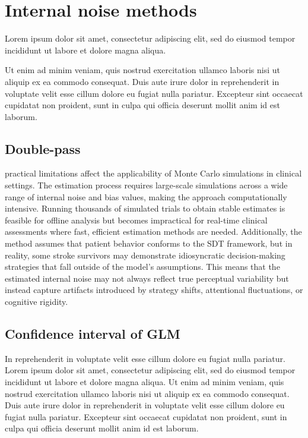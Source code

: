 \renewcommand{\chaptername}{Chapter} 
\chapter{Internal noise methods}\label{chap6}

Lorem ipsum dolor sit amet, consectetur adipiscing elit, sed do eiusmod tempor incididunt ut labore et dolore magna aliqua. 

Ut enim ad minim veniam, quis nostrud exercitation ullamco laboris nisi ut aliquip ex ea commodo consequat. Duis aute irure dolor in reprehenderit in voluptate velit esse cillum dolore eu fugiat nulla pariatur. Excepteur sint occaecat cupidatat non proident, sunt in culpa qui officia deserunt mollit anim id est laborum.

\section {Double-pass}

practical limitations affect the applicability of Monte Carlo simulations in clinical settings. The estimation process requires large-scale simulations across a wide range of internal noise and bias values, making the approach computationally intensive. Running thousands of simulated trials to obtain stable estimates is feasible for offline analysis but becomes impractical for real-time clinical assessments where fast, efficient estimation methods are needed. Additionally, the method assumes that patient behavior conforms to the SDT framework, but in reality, some stroke survivors may demonstrate idiosyncratic decision-making strategies that fall outside of the model’s assumptions. This means that the estimated internal noise may not always reflect true perceptual variability but instead capture artifacts introduced by strategy shifts, attentional fluctuations, or cognitive rigidity.

\section {Confidence interval of GLM} In reprehenderit in voluptate velit esse cillum dolore eu fugiat nulla pariatur. Lorem ipsum dolor sit amet, consectetur adipiscing elit, sed do eiusmod tempor incididunt ut labore et dolore magna aliqua. Ut enim ad minim veniam, quis nostrud exercitation ullamco laboris nisi ut aliquip ex ea commodo consequat. Duis aute irure dolor in reprehenderit in voluptate velit esse cillum dolore eu fugiat nulla pariatur. Excepteur sint occaecat cupidatat non proident, sunt in culpa qui officia deserunt mollit anim id est laborum.

